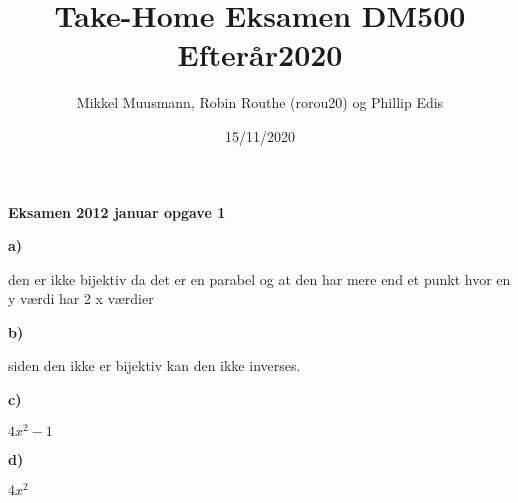 \documentclass{article}
\title{\textbf{Take-Home Eksamen DM500 Efterår2020}}
\author{Mikkel Muusmann, Robin Routhe (rorou20) og Phillip Edis}
\date{15/11/2020}
\begin{document}
\maketitle

\textbf{Eksamen 2012 januar opgave 1}

\textbf{a)}

den er ikke bijektiv da det er en parabel og at den har mere end et punkt
hvor en y værdi har 2 x værdier 

\textbf{b)}

siden den ikke er bijektiv kan den ikke inverses.

\textbf{c)}

$4x^2-1$

\textbf{d)}

$4x^2$
\end{document}
